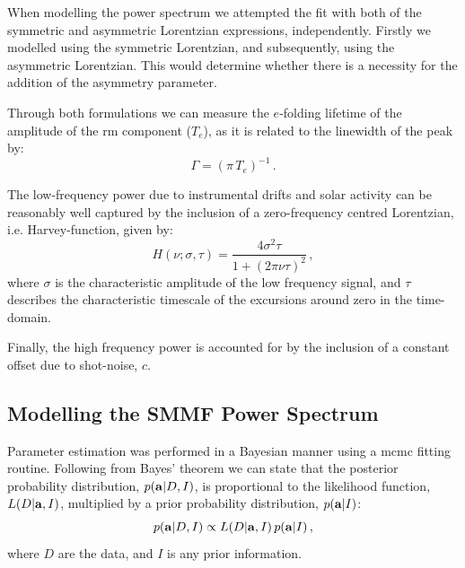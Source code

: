 When modelling the power spectrum we attempted the fit with both of the symmetric and asymmetric Lorentzian expressions, independently. Firstly we modelled using the symmetric Lorentzian, and subsequently, using the asymmetric Lorentzian. This would determine whether there is a necessity for the addition of the asymmetry parameter.

Through both formulations we can measure the $e$-folding lifetime of the amplitude of the \gls{rm} component ($T_e$), as it is related to the linewidth of the peak by:
%
\begin{equation}
\Gamma  = (\pi \, T_e)^{-1} \, .
\label{eq:mode_lifetime}
\end{equation}


The low-frequency power due to instrumental drifts and solar activity can be reasonably well captured by the inclusion of a zero-frequency centred Lorentzian, i.e. Harvey-function, given by:
%
\begin{equation}
H(\nu; \sigma, \tau) = \frac{4{\sigma}^2\tau}{1 + (2\pi \nu\tau)^2} \, ,
\label{eq:harvey}
\end{equation}
%
where $\sigma$ is the characteristic amplitude of the low frequency signal, and $\tau$ describes the characteristic timescale of the excursions around zero in the time-domain.


Finally, the high frequency power is accounted for by the inclusion of a constant offset due to shot-noise, $c$.


\subsection{Modelling the SMMF Power Spectrum}
\label{sec:method_modelling}

Parameter estimation was performed in a Bayesian manner using a \gls{mcmc} fitting routine. Following from Bayes’ theorem we can state that the posterior probability distribution, $p({\bf a} | D, I)$, is proportional to the likelihood function, $L(D | {\bf a}, I)$, multiplied by a prior probability distribution, $p({\bf a} | I)$:
%
\begin{equation}
p({\bf a} | D, I) \propto L(D | {\bf a}, I) \, p({\bf a} | I) \, ,
\label{eq:bayes}
\end{equation}
%
where $D$ are the data, and $I$ is any prior information.

